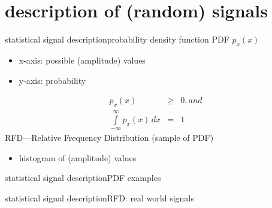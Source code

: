     \section[signal description]{description of (random) signals}
            \begin{frame}{statistical signal description}{probability density function}
                PDF $p_x(x)$
                \begin{itemize}
                    \item	x-axis: possible (amplitude) values
                    \item	y-axis: probability
                \end{itemize}
                \pause
                \begin{eqnarray*}
                    p_x(x)&\geq& 0 , and\\	
                    \int\limits_{-\infty}^{\infty}{p_x(x)\, dx} &=& 1	
                \end{eqnarray*}
                \pause
                RFD---Relative Frequency Distribution (sample of PDF)
                \begin{itemize}
                    \item[] histogram of (amplitude) values
                \end{itemize}
            \end{frame}	
            
            \begin{frame}{statistical signal description}{PDF examples}
            \end{frame}
                
            \begin{frame}{statistical signal description}{RFD: real world signals}
            \end{frame}	
            
